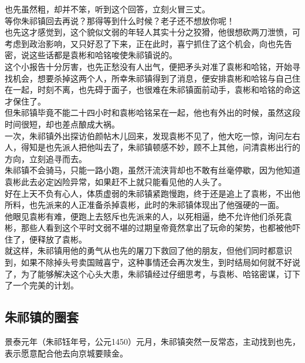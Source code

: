 \begin{multicols}{\theparacolNo}
也先虽然粗，却并不笨，听到这个回答，立刻火冒三丈。\\

等你朱祁镇回去再说？那得等到什么时候？老子还不想放你呢！\\

也先这才感觉到，这个貌似文弱的年轻人其实十分之狡猾，他很想砍两刀泄愤，可考虑到政治影响，又只好忍了下来，正在此时，喜宁抓住了这个机会，向也先告密，说这些话都是袁彬和哈铭唆使朱祁镇说的。\\

这个小报告十分厉害，也先正愁没有人出气，便把矛头对准了袁彬和哈铭，开始寻找机会，想要杀掉这两个人，所幸朱祁镇得到了消息，便安排袁彬和哈铭与自己住在一起，时刻不离，也先碍于面子，也很难在朱祁镇面前动手，袁彬和哈铭的命这才保住了。\\

但朱祁镇毕竟不能二十四小时和袁彬哈铭呆在一起，他也有外出的时候，虽然这段时间很短，却也差点酿成大祸。\\

一次，朱祁镇外出探访伯颜帖木儿回来，发现袁彬不见了，他大吃一惊，询问左右人，得知是也先派人把他叫去了，朱祁镇顿感不妙，顾不上其他，问清袁彬出行的方向，立刻追寻而去。\\

朱祁镇不会骑马，只能一路小跑，虽然汗流浃背却也不敢有丝毫停歇，因为他知道袁彬此去必定凶险异常，如果赶不上就只能看见他的人头了。\\

好在上天不负有心人，体质虚弱的朱祁镇紧跑慢跑，终于还是追上了袁彬，不出他所料，也先派来的人正准备杀掉袁彬，此时的朱祁镇体现出了他强硬的一面。\\

他眼见袁彬有难，便跑上去怒斥也先派来的人，以死相逼，绝不允许他们杀死袁彬，那些人看到这个平时文弱不堪的过期皇帝竟然拿出了玩命的架势，也都被他吓住了，便释放了袁彬。\\

就这样，朱祁镇用他的勇气从也先的屠刀下救回了他的朋友，但他们同时都意识到，如果不除掉头号卖国贼喜宁，这种事情还会再次发生，到时结局如何就不好说了，为了能够解决这个心头大患，朱祁镇经过仔细思考，与袁彬、哈铭密谋，订下了一个完美的计划。\\

\subsection{朱祁镇的圈套}
景泰元年（朱祁钰年号，公元1450）元月，朱祁镇突然一反常态，主动找到也先，表示愿意配合他去向京城要赎金。\\


\end{multicols}
